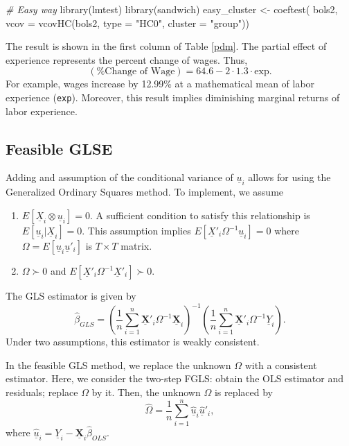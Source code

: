 \documentclass[
  12pt,
]{article}
\newenvironment{Shaded}{\begin{snugshade}}{\end{snugshade}}
\newcommand{\AttributeTok}[1]{\textcolor[rgb]{0.77,0.63,0.00}{#1}}
\newcommand{\CommentTok}[1]{\textcolor[rgb]{0.56,0.35,0.01}{\textit{#1}}}
\newcommand{\FunctionTok}[1]{\textcolor[rgb]{0.00,0.00,0.00}{#1}}
\newcommand{\NormalTok}[1]{#1}
\newcommand{\OtherTok}[1]{\textcolor[rgb]{0.56,0.35,0.01}{#1}}
\newcommand{\StringTok}[1]{\textcolor[rgb]{0.31,0.60,0.02}{#1}}
\providecommand{\tightlist}{%
  \setlength{\itemsep}{0pt}\setlength{\parskip}{0pt}}
\begin{document}
\begin{Shaded}
\begin{Highlighting}[]
\CommentTok{\# Easy way}
\FunctionTok{library}\NormalTok{(lmtest)}
\FunctionTok{library}\NormalTok{(sandwich)}
\NormalTok{easy\_cluster }\OtherTok{\textless{}{-}} \FunctionTok{coeftest}\NormalTok{(}
\NormalTok{  bols2, }\AttributeTok{vcov =} \FunctionTok{vcovHC}\NormalTok{(bols2, }\AttributeTok{type =} \StringTok{"HC0"}\NormalTok{, }\AttributeTok{cluster =} \StringTok{"group"}\NormalTok{))}
\end{Highlighting}
\end{Shaded}

The result is shown in the first column of Table \ref{pdm}. The partial
effect of experience represents the percent change of wages. Thus, \[
  (\text{\% Change of Wage}) = 64.6 - 2 \cdot 1.3 \cdot \text{exp}.
\] For example, wages increase by 12.99\% at a mathematical mean of
labor experience (\texttt{exp}). Moreover, this result implies
diminishing marginal returns of labor experience.

\hypertarget{feasible-glse}{%
\subsection{Feasible GLSE}\label{feasible-glse}}

Adding and assumption of the conditional variance of \(\underline{u}_i\)
allows for using the Generalized Ordinary Squares method. To implement,
we assume

\begin{enumerate}
\def\labelenumi{\arabic{enumi}.}
\tightlist
\item
  \(E[\underline{X}_i \otimes \underline{u}_i] = 0\). A sufficient
  condition to satisfy this relationship is
  \(E[ \underline{u}_i | \underline{X}_i] = 0\). This assumption implies
  \(E[\underline{X}'_i \Omega^{-1} \underline{u}_i] = 0\) where
  \(\Omega = E[\underline{u}_i\underline{u}'_i]\) is \(T \times T\)
  matrix.
\item
  \(\Omega \succ 0\) and
  \(E[\underline{X}'_i \Omega^{-1} \underline{X}'_i] \succ 0\).
\end{enumerate}

The GLS estimator is given by \[
  \hat{\beta}_{GLS} 
  = \left( \frac{1}{n} \sum_{i=1}^n \underline{\mathbf{X}}'_i \Omega^{-1} \underline{\mathbf{X}}_i \right)^{-1}
  \left( \frac{1}{n} \sum_{i=1}^n \underline{\mathbf{X}}'_i \Omega^{-1} \underline{Y}_i \right).
\] Under two assumptions, this estimator is weakly consistent.

In the feasible GLS method, we replace the unknown \(\Omega\) with a
consistent estimator. Here, we consider the two-step FGLS: obtain the
OLS estimator and residuals; replace \(\Omega\) by it. Then, the unknown
\(\Omega\) is replaced by \[
  \hat{\Omega} = \frac{1}{n} \sum_{i=1}^n \underline{\hat{u}}_i\underline{\hat{u}}'_i,
\] where
\(\underline{\hat{u}}_i = \underline{Y}_i - \underline{\mathbf{X}}_i \hat{\beta}_{OLS}\).
\end{document}
